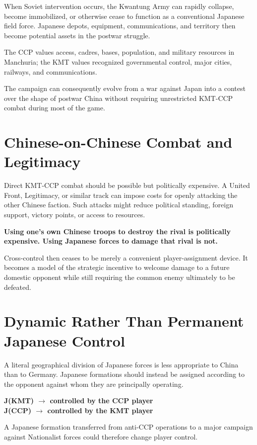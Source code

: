 \documentclass[11pt]{article}
\begin{document}
When Soviet intervention occurs, the Kwantung Army can rapidly collapse, become immobilized, or otherwise cease to function as a conventional Japanese field force. Japanese depots, equipment, communications, and territory then become potential assets in the postwar struggle.


The CCP values access, cadres, bases, population, and military resources in Manchuria; the KMT values recognized governmental control, major cities, railways, and communications.


The campaign can consequently evolve from a war against Japan into a contest over the shape of postwar China without requiring unrestricted KMT-CCP combat during most of the game.


\section{Chinese-on-Chinese Combat and Legitimacy}
Direct KMT-CCP combat should be possible but politically expensive. A United Front, Legitimacy, or similar track can impose costs for openly attacking the other Chinese faction. Such attacks might reduce political standing, foreign support, victory points, or access to resources.


\textbf{Using one's own Chinese troops to destroy the rival is politically expensive. Using Japanese forces to damage that rival is not.}


Cross-control then ceases to be merely a convenient player-assignment device. It becomes a model of the strategic incentive to welcome damage to a future domestic opponent while still requiring the common enemy ultimately to be defeated.


\section{Dynamic Rather Than Permanent Japanese Control}
A literal geographical division of Japanese forces is less appropriate to China than to Germany. Japanese formations should instead be assigned according to the opponent against whom they are principally operating.


\textbf{J(KMT) $\rightarrow$ controlled by the CCP player}\\\textbf{J(CCP) $\rightarrow$ controlled by the KMT player}


A Japanese formation transferred from anti-CCP operations to a major campaign against Nationalist forces could therefore change player control.
\end{document}
